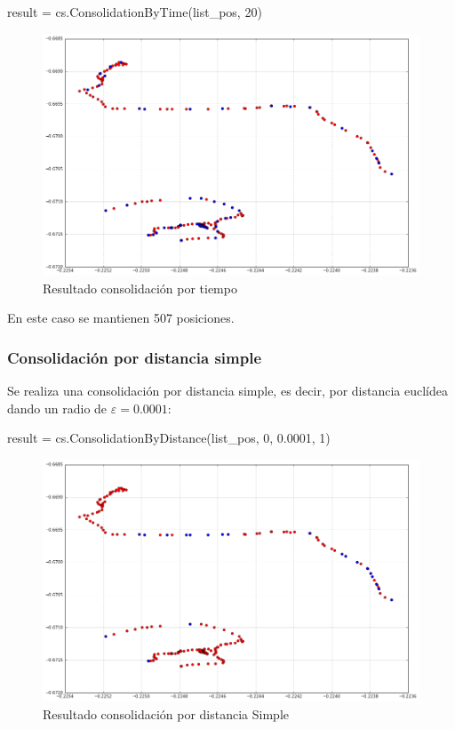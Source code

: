 \documentclass[a4paper, 12pt]{article}
\begin{document}
\begin{python}
result = cs.ConsolidationByTime(list_pos, 20)
\end{python}

\begin{figure}[H]
	\includegraphics[scale=.45]{../comparativa/byTimeSuj1.png}
	\caption{Resultado consolidaci\'on por tiempo}
\end{figure}

En este caso se mantienen 507 posiciones.

\pagebreak
\subsubsection{Consolidaci\'on por distancia simple}

Se realiza una consolidaci\'on por distancia simple, es decir, por distancia eucl\'idea dando un radio de $\varepsilon = 0.0001$:\\

\begin{python}
result = cs.ConsolidationByDistance(list_pos, 0, 0.0001, 1)
\end{python}

\begin{figure}[H]
	\includegraphics[scale=.45]{../comparativa/distanceEuEps10-4.png}
	\caption{Resultado consolidaci\'on por distancia Simple}
\end{figure}
\end{document}
